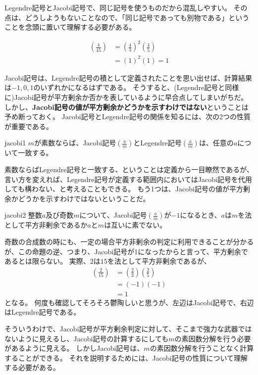 Legendre記号とJacobi記号で、同じ記号を使うものだから混乱しやすい。
その点は、どうしようもないことなので、「同じ記号であっても別物である」ということを念頭に置いて理解する必要がある。

\begin{Exam}{}{}
\begin{align*}
\left(\frac{4}{45}\right) &= \left(\frac{4}{3}\right)^2\left(\frac{4}{5}\right)\\
&= (1)^2(1) = 1
\end{align*}
\end{Exam}

Jacobi記号は、Legendre記号の積として定義されたことを思い出せば、計算結果は$-1,0,1$のいずれかになるはずである。
そうすると、(Legendre記号と同様に)Jacobi記号が平方剰余か否かを表しているように早合点してしまいがちだ。
しかし、\textbf{Jacobi記号の値が平方剰余かどうかを示すわけではない}ということは予め断っておく。
Jacobi記号とLegendre記号の関係を知るには、次の2つの性質が重要である。

\begin{Prop}{}{jacobi1}
$m$が素数ならば、Jacobi記号$\left(\frac{a}{m}\right)$とLegendre記号$\left(\frac{a}{m}\right)$は、任意の$a$について一致する。
\end{Prop}

素数ならばLegendre記号と一致する、ということは定義から一目瞭然であるが、言い方を変えれば、Legendre記号が定義する範囲内においてはJacobi記号を代用しても構わない、と考えることもできる。
もう1つは、Jacobi記号の値が平方剰余かどうかを示すわけではないということだ。

\begin{Prop}{}{jacobi2}
整数$a$及び奇数$m$について、Jacobi記号$\left(\frac{a}{m}\right)$が$-1$になるとき、$a$は$m$を法として平方非剰余であるか$a$と$m$は互いに素でない。
\end{Prop}

奇数の合成数の時にも、一定の場合平方非剰余の判定に利用できることが分かるが、この命題の逆、つまり、Jacobi記号が1になったからと言って、平方剰余であるとは限らない。
実際、$2$は$15$を法として平方非剰余であるが、
\begin{align*}
\left(\frac{2}{15}\right) &= \left(\frac{2}{3}\right)\left(\frac{2}{5}\right)\\
&= (-1)(-1)\\
&= 1
\end{align*}
となる。
何度も確認してそろそろ鬱陶しいと思うが、左辺はJacobi記号で、右辺はLegendre記号である。

そういうわけで、Jacobi記号が平方剰余判定に対して、そこまで強力な武器ではないように見えるし、Jacobi記号の計算するにしても$m$の素因数分解を行う必要があるように見える。
しかしJacobi記号は、$m$の素因数分解を行うことなく計算することができる。
それを説明するためには、Jacobi記号の性質について理解する必要がある。

